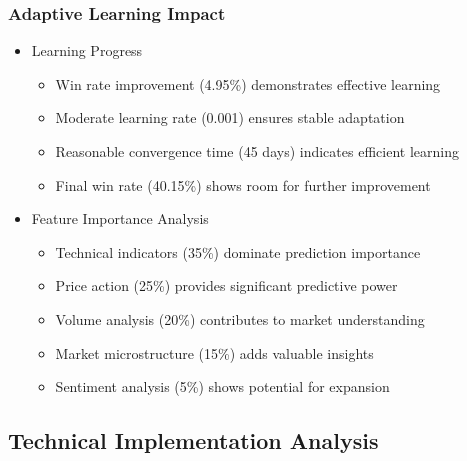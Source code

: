 \documentclass[conference]{IEEEtran}
\begin{document}
\subsubsection{Adaptive Learning Impact}
\begin{itemize}
    \item Learning Progress
    \begin{itemize}
        \item Win rate improvement (4.95\%) demonstrates effective learning
        \item Moderate learning rate (0.001) ensures stable adaptation
        \item Reasonable convergence time (45 days) indicates efficient learning
        \item Final win rate (40.15\%) shows room for further improvement
    \end{itemize}
    
    \item Feature Importance Analysis
    \begin{itemize}
        \item Technical indicators (35\%) dominate prediction importance
        \item Price action (25\%) provides significant predictive power
        \item Volume analysis (20\%) contributes to market understanding
        \item Market microstructure (15\%) adds valuable insights
        \item Sentiment analysis (5\%) shows potential for expansion
    \end{itemize}
\end{itemize}

\subsection{Technical Implementation Analysis}
\end{document}
